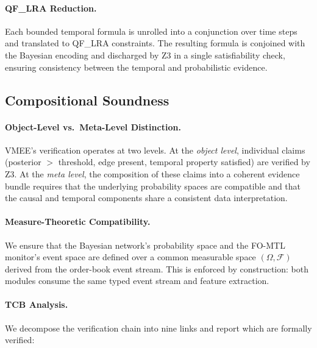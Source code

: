 \documentclass[11pt]{article}
\begin{document}
\paragraph{QF\_LRA Reduction.}
Each bounded temporal formula is unrolled into a conjunction over time steps and translated to QF\_LRA constraints.
The resulting formula is conjoined with the Bayesian encoding and discharged by Z3 in a single satisfiability check, ensuring consistency between the temporal and probabilistic evidence.

\subsection{Compositional Soundness}
\label{sec:compositional}

\paragraph{Object-Level vs.\ Meta-Level Distinction.}
VMEE's verification operates at two levels.
At the \emph{object level}, individual claims (posterior $>$ threshold, edge present, temporal property satisfied) are verified by Z3.
At the \emph{meta level}, the composition of these claims into a coherent evidence bundle requires that the underlying probability spaces are compatible and that the causal and temporal components share a consistent data interpretation.

\paragraph{Measure-Theoretic Compatibility.}
We ensure that the Bayesian network's probability space and the FO-MTL monitor's event space are defined over a common measurable space $(\Omega, \mathcal{F})$ derived from the order-book event stream.
This is enforced by construction: both modules consume the same typed event stream and feature extraction.

\paragraph{TCB Analysis.}
\label{sec:tcb}
We decompose the verification chain into nine links and report which are formally verified:
\end{document}
